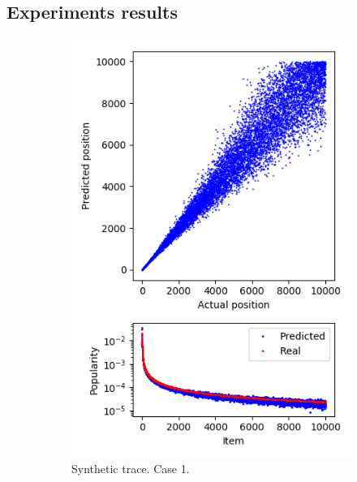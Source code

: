 \subsection{Experiments results}

\begin{figure}[b!]
	\centering
	\begin{subfigure}[b]{0.49\linewidth}
		\includegraphics[width=\linewidth]{pics/case1_op.png}
		\caption{Synthetic trace. Case 1.}
	\end{subfigure}
	\begin{subfigure}[b]{0.49\linewidth}

\end{subfigure}
\end{figure}
